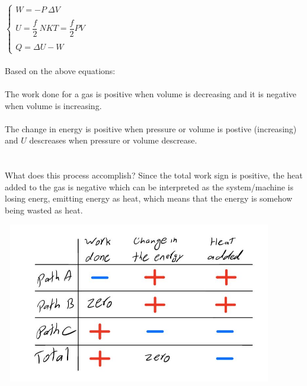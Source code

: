 \documentclass[fleqn]{article}
\begin{document}
\begin{enumerate}
      \textcolor{hwColor}{
        \\
        $
          \begin{cases}
            W=-P ~ \Delta V
            \\
            \\
            U=\dfrac{f}{2} ~ NKT=\dfrac{f}{2} PV
            \\
            \\
            Q=\Delta U-W
          \end{cases}
        $
        \\
        \\
        Based on the above equations:
        \\
        \\
        The work done for a gas is positive when volume is decreasing and it is negative when volume is increasing.
        \\
        \\
        The change in energy is positive when pressure or volume is postive (increasing) and $U$ descreases when 
        pressure or volume descrease.
        \\
        \\
        \\
        What does this process accomplish? Since the total work sign is positive, the heat added to the gas is negative which can be 
        interpreted as the system/machine is losing energ, emitting energy as heat, which means that the energy is somehow being wasted
        as heat.  
      }

      \begin{center}
        \includegraphics[height=7cm, width=12cm]{3.JPG}
      \end{center}


\end{enumerate}
\end{document}
